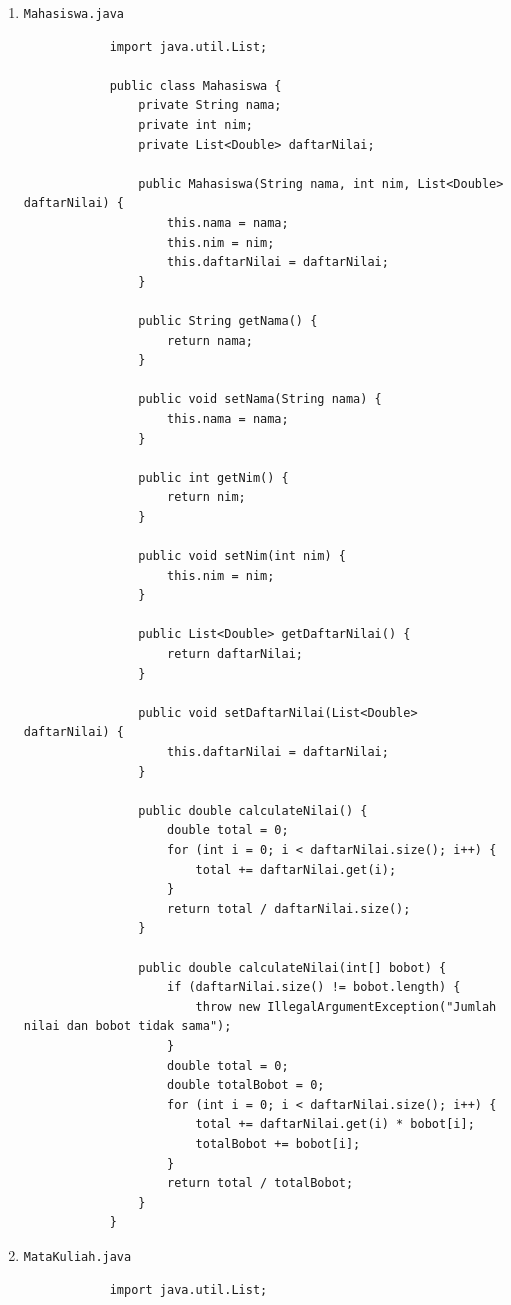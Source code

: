 \documentclass[12pt,titlepage]{article}
\begin{document}
\begin{enumerate}
    \item {
        \texttt{Mahasiswa.java}
        \begin{verbatim}
            import java.util.List;

            public class Mahasiswa {
                private String nama;
                private int nim;
                private List<Double> daftarNilai;

                public Mahasiswa(String nama, int nim, List<Double> daftarNilai) {
                    this.nama = nama;
                    this.nim = nim;
                    this.daftarNilai = daftarNilai;
                }

                public String getNama() {
                    return nama;
                }

                public void setNama(String nama) {
                    this.nama = nama;
                }

                public int getNim() {
                    return nim;
                }

                public void setNim(int nim) {
                    this.nim = nim;
                }

                public List<Double> getDaftarNilai() {
                    return daftarNilai;
                }

                public void setDaftarNilai(List<Double> daftarNilai) {
                    this.daftarNilai = daftarNilai;
                }

                public double calculateNilai() {
                    double total = 0;
                    for (int i = 0; i < daftarNilai.size(); i++) {
                        total += daftarNilai.get(i);
                    }
                    return total / daftarNilai.size();
                }

                public double calculateNilai(int[] bobot) {
                    if (daftarNilai.size() != bobot.length) {
                        throw new IllegalArgumentException("Jumlah nilai dan bobot tidak sama");
                    }
                    double total = 0;
                    double totalBobot = 0;
                    for (int i = 0; i < daftarNilai.size(); i++) {
                        total += daftarNilai.get(i) * bobot[i];
                        totalBobot += bobot[i];
                    }
                    return total / totalBobot;
                }
            }
        \end{verbatim}
    }
    \item {
        \texttt{MataKuliah.java}
        \begin{verbatim}
            import java.util.List;


\end{verbatim}}
\end{enumerate}
\end{document}
